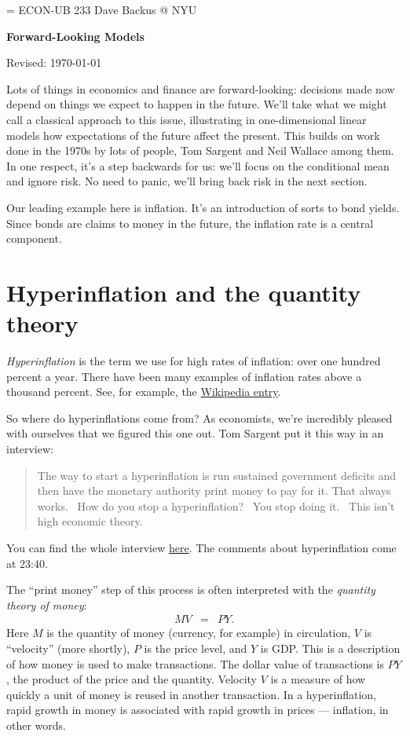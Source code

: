 \documentclass[11pt]{article}
\begin{document}
\parskip=\bigskipamount
\parindent=0.0in
\thispagestyle{empty}
{\large ECON-UB 233 \hfill Dave Backus @ NYU}

\bigskip\bigskip
\centerline{\Large \bf Forward-Looking Models}
\centerline{Revised: \today}

\bigskip
Lots of things in economics and finance are forward-looking:
decisions made now depend on things we expect to happen in the future.
We'll take what we might call a classical approach to this issue,
illustrating in one-dimensional linear models how expectations of
the future affect the present.
This builds on work done in the 1970s by lots of people,
Tom Sargent and Neil Wallace among them.
In one respect, it's a step backwards for us:  we'll focus on the conditional mean
and ignore risk.
No need to panic, we'll bring back risk in the next section.

Our leading example here is inflation.
It's an introduction of sorts to bond yields.
Since bonds are claims to money in the future,
the inflation rate is a central component.


\section{Hyperinflation and the quantity theory}

{\it Hyperinflation\/} is the term we use for high rates of inflation:
over one hundred percent a year.
There have been many examples of inflation rates above a thousand percent.
See, for example, the
\href{http://en.wikipedia.org/wiki/Hyperinflation}{Wikipedia entry}.

So where do hyperinflations come from?
As economists, we're incredibly pleased with ourselves that we figured this one out.
Tom Sargent put it this way in an interview:
\begin{quote}
The way to start a hyperinflation is run sustained government deficits and then have the monetary authority print money to pay for it.  That always works.  How do you stop a hyperinflation?  You stop doing it.  This isn't high economic theory.
\end{quote}
You can find the whole interview
\href{http://youtu.be/bVIOClT4Rws}{here}.
The comments about hyperinflation come at 23:40.

The ``print money'' step of this process is often interpreted with the
{\it quantity theory of money\/}:
\begin{eqnarray*}
    M V &=& P Y .
\end{eqnarray*}
Here $M$ is the quantity of money (currency, for example) in circulation,
$V$ is ``velocity'' (more shortly),
$P$ is the price level, and $Y$ is GDP.
This is a description of how money is used to make transactions.
The dollar value of transactions is $PY$, the product of the price and the quantity.
Velocity $V$ is a measure of how quickly a unit of  money is reused in another transaction.
In a hyperinflation, rapid growth in money is associated
with rapid growth in prices --- inflation, in other words.
\end{document}
